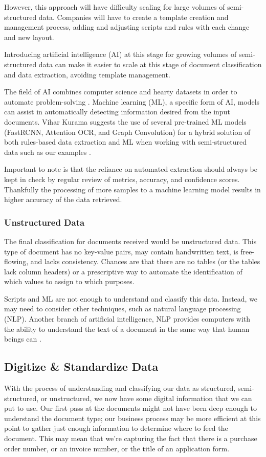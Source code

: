 \documentclass[conference]{IEEEtran}
\begin{document}
However, this approach will have difficulty scaling for large volumes of semi-structured data. Companies will have to create a template creation and management process, adding and adjusting scripts and rules with each change and new layout.

Introducing artificial intelligence (AI) at this stage for growing volumes of semi-structured data can make it easier to scale at this stage of document classification and data extraction, avoiding template management. 

The field of AI combines computer science and hearty datasets in order to automate problem-solving \cite{ibm:ai}. Machine learning (ML), a specific form of AI, models can assist in automatically detecting information desired from the input documents. Vihar Kurama suggests the use of several pre-trained ML models (FastRCNN, Attention OCR, and Graph Convolution) for a hybrid solution of both rules-based data extraction and ML when working with semi-structured data such as our examples \cite{kurama2021a}.

Important to note is that the reliance on automated extraction should always be kept in check by regular review of metrics, accuracy, and confidence scores. Thankfully the processing of more samples to a machine learning model results in higher accuracy of the data retrieved.

\subsubsection{Unstructured Data}
The final classification for documents received would be unstructured data. This type of document has no key-value pairs, may contain handwritten text, is free-flowing, and lacks consistency. Chances are that there are no tables (or the tables lack column headers) or a prescriptive way to automate the identification of which values to assign to which purposes.

Scripts and ML are not enough to understand and classify this data. Instead, we may need to consider other techniques, such as natural language processing (NLP). Another branch of artificial intelligence, NLP provides computers with the ability to understand the text of a document in the same way that human beings can \cite{ibm:nlp}.

\subsection{Digitize \& Standardize Data}
With the process of understanding and classifying our data as structured, semi-structured, or unstructured, we now have some digital information that we can put to use. Our first pass at the documents might not have been deep enough to understand the document type; our business process may be more efficient at this point to gather just enough information to determine where to feed the document. This may mean that we're capturing the fact that there is a purchase order number, or an invoice number, or the title of an application form. 
\end{document}
